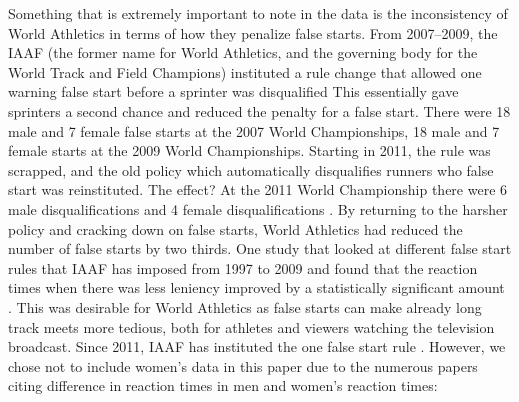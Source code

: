 \documentclass[12pt, letterpaper, titlepage]{article}
\begin{document}
Something that is extremely important to note in the data is the inconsistency 
of World Athletics in terms of how they penalize false starts.  From 2007--2009,
the IAAF (the former name for World Athletics, and the governing body for the 
World Track and Field Champions) instituted a rule change that allowed one 
warning false start before a sprinter was disqualified \citep{iaaf2009falsestart}  This 
essentially gave sprinters a second chance and reduced the penalty for a false 
start.  There were 18 male and 7 female false starts at the 2007 World 
Championships, 18 male and 7 female starts at the 2009 World Championships. 
Starting in 2011, the rule was scrapped, and the old policy which automatically 
disqualifies runners who false start was reinstituted.  The effect? At the 2011 
World Championship there were 6 male disqualifications and 4 female 
disqualifications \citep{iaaf2009falsestart}. By returning to the harsher policy and 
cracking down on false starts, World Athletics had reduced the number of 
false starts by two thirds. One study that looked at different false start
rules that IAAF has imposed from 1997 to 2009 and found that the reaction 
times when there was less leniency improved by a statistically significant amount
\citep{haugen2013effect}. This was desirable for World Athletics as false starts can 
make already long track meets more tedious, both for athletes and viewers watching the 
television broadcast.  Since 2011, IAAF has instituted the one false start rule
\citep{iaaf2009falsestart}.  However, we chose not to include women's data in this
paper due to the numerous papers citing difference in reaction times in men and
women's reaction times: \citep{lipps2011implications, babicc2009reaction,
panoutsakopoulos2020gender}
\end{document}
